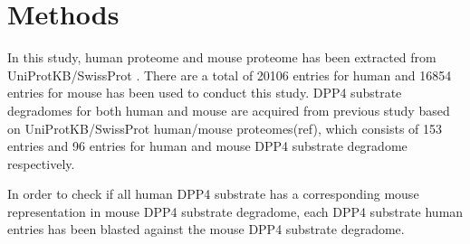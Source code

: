 \section{Methods}
In this study, human proteome and mouse proteome has been extracted from UniProtKB/SwissProt \cite{2007}. There are a total of 20106 entries for human and 16854 entries for mouse has been used to conduct this study. DPP4 substrate degradomes for both human and mouse are acquired from previous study based on UniProtKB/SwissProt human/mouse proteomes(ref), which consists of 153 entries and 96 entries for human and mouse DPP4 substrate degradome respectively. 

In order to check if all human DPP4 substrate has a corresponding mouse representation in mouse DPP4 substrate degradome, each DPP4 substrate human entries has been blasted against the mouse DPP4 substrate degradome. 
 
